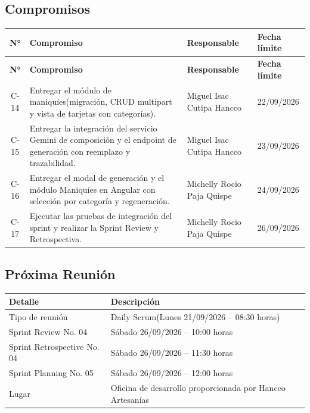 \documentclass[12pt,a4paper]{article}
\begin{document}
\subsection*{Compromisos}

{\small
\begin{longtable}{c p{7.8cm} p{4.2cm} p{2.0cm}}
\toprule
\textbf{N°} & \textbf{Compromiso} & \textbf{Responsable} & \textbf{Fecha límite} \\
\midrule
\endfirsthead

\toprule
\textbf{N°} & \textbf{Compromiso} & \textbf{Responsable} & \textbf{Fecha límite} \\
\midrule
\endhead

\bottomrule
\endlastfoot

C-14 & Entregar el módulo de maniquíes(migración, CRUD multipart y vista de tarjetas con categorías). & Miguel Isac Cutipa Hancco & 22/09/2026 \\
C-15 & Entregar la integración del servicio Gemini de composición y el endpoint de generación con reemplazo y trazabilidad. & Miguel Isac Cutipa Hancco & 23/09/2026 \\
C-16 & Entregar el modal de generación y el módulo Maniquíes en Angular con selección por categoría y regeneración. & Michelly Rocio Paja Quispe & 24/09/2026 \\
C-17 & Ejecutar las pruebas de integración del sprint y realizar la Sprint Review y Retrospectiva. & Michelly Rocio Paja Quispe & 26/09/2026 \\

\end{longtable}
}

\subsection*{Próxima Reunión}

\begin{center}
\small
\begin{tabularx}{\textwidth}{p{4.5cm} L}
\toprule
\textbf{Detalle} & \textbf{Descripción} \\
\midrule
Tipo de reunión & Daily Scrum(Lunes 21/09/2026 -- 08:30 horas) \\
Sprint Review No. 04 & Sábado 26/09/2026 -- 10:00 horas \\
Sprint Retrospective No. 04 & Sábado 26/09/2026 -- 11:30 horas \\
Sprint Planning No. 05 & Sábado 26/09/2026 -- 12:00 horas \\
Lugar & Oficina de desarrollo proporcionada por Hancco Artesanías \\
\bottomrule
\end{tabularx}
\end{center}
\end{document}
